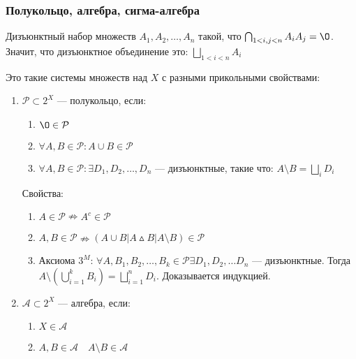 \documentclass{article}
\begin{document}
\subsubsection{Полукольцо, алгебра, сигма-алгебра}

Дизъюнктный набор множеств $A_1, A_2, \ldots, A_n$ такой, что $\bigcap_{1 < i, j < n} A_i A_j = \O$. Значит, что дизъюнктное объединение это: $\bigsqcup_{1 < i < n} A_i$

Это такие системы множеств над $X$ с разными прикольными свойствами: 

\begin{enumerate}
    \item $\mathcal{P} \subset 2^X$ --- полукольцо, если: 
        \begin{enumerate}
            \item $\O \in \mathcal{P}$
            \item $\forall A, B \in \mathcal{P}: A \cup B \in \mathcal{P}$
            \item $\forall A, B \in \mathcal{P}: \exists D_1, D_2, \ldots, D_n$ --- дизъюнктные, такие что: $A \setminus B = \bigsqcup_{i} D_i$
        \end{enumerate}
        
        Свойства: 
        \begin{enumerate}
            \item $A \in \mathcal{P} \nRightarrow A^c \in \mathcal{P}$
            \item $A, B \in \mathcal{P} \nRightarrow (A \cup B | A \vartriangle B | A \setminus B) \in \mathcal{P}$
            \item Аксиома $3^M$: $\forall A, B_1, B_2, \ldots, B_k \in \mathcal{P} \exists D_1, D_2, \ldots D_n$ --- дизъюнктные. Тогда $A \setminus \left(\bigcup_{i = 1}^{k} B_i\right) = \bigsqcup_{i = 1}^{n} D_i$. Доказывается индукцией.
        \end{enumerate}

    \item $\mathcal{A} \subset 2^X$ --- алгебра, если: 
        \begin{enumerate}
            \item $X \in \mathcal{A}$
            \item $A, B \in \mathcal{A} \quad A \setminus B \in \mathcal{A}$
        \end{enumerate}


\end{enumerate}
\end{document}
